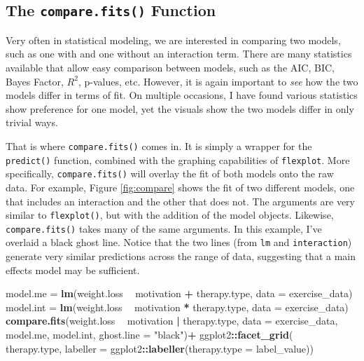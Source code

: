 \documentclass[
  doc]{apa6}
\newenvironment{Shaded}{\begin{snugshade}}{\end{snugshade}}
\newcommand{\DataTypeTok}[1]{\textcolor[rgb]{0.13,0.29,0.53}{#1}}
\newcommand{\KeywordTok}[1]{\textcolor[rgb]{0.13,0.29,0.53}{\textbf{#1}}}
\newcommand{\NormalTok}[1]{#1}
\newcommand{\OperatorTok}[1]{\textcolor[rgb]{0.81,0.36,0.00}{\textbf{#1}}}
\newcommand{\StringTok}[1]{\textcolor[rgb]{0.31,0.60,0.02}{#1}}
\begin{document}
\hypertarget{the-compare.fits-function}{%
\subsection{\texorpdfstring{The \texttt{compare.fits()} Function}{The compare.fits() Function}}\label{the-compare.fits-function}}

Very often in statistical modeling, we are interested in comparing two models, such as one with and one without an interaction term. There are many statistics available that allow easy comparison between models, such as the AIC, BIC, Bayes Factor, \(R^2\), p-values, etc. However, it is again important to \emph{see} how the two models differ in terms of fit. On multiple occasions, I have found various statistics show preference for one model, yet the visuals show the two models differ in only trivial ways.

That is where \texttt{compare.fits()} comes in. It is simply a wrapper for the \texttt{predict()} function, combined with the graphing capabilities of \texttt{flexplot}. More specifically, \texttt{compare.fits()} will overlay the fit of both models onto the raw data. For example, Figure \ref{fig:compare} shows the fit of two different models, one that includes an interaction and the other that does not. The arguments are very similar to \texttt{flexplot()}, but with the addition of the model objects. Likewise, \texttt{compare.fits()} takes many of the same arguments. In this example, I've overlaid a black ghost line. Notice that the two lines (from \texttt{lm} and \texttt{interaction}) generate very similar predictions across the range of data, suggesting that a main effects model may be sufficient.

\begin{Shaded}
\begin{Highlighting}[]
\NormalTok{model.me =}\StringTok{ }\KeywordTok{lm}\NormalTok{(weight.loss }\OperatorTok{~}\StringTok{ }\NormalTok{motivation }\OperatorTok{+}\StringTok{ }\NormalTok{therapy.type, }\DataTypeTok{data =}\NormalTok{ exercise_data)}
\NormalTok{model.int =}\StringTok{ }\KeywordTok{lm}\NormalTok{(weight.loss }\OperatorTok{~}\StringTok{ }\NormalTok{motivation }\OperatorTok{*}\StringTok{ }\NormalTok{therapy.type, }\DataTypeTok{data =}\NormalTok{ exercise_data)}
\KeywordTok{compare.fits}\NormalTok{(weight.loss }\OperatorTok{~}\StringTok{ }\NormalTok{motivation }\OperatorTok{|}\StringTok{ }\NormalTok{therapy.type, }
             \DataTypeTok{data =}\NormalTok{ exercise_data, model.me, model.int, }\DataTypeTok{ghost.line =} \StringTok{"black"}\NormalTok{)}\OperatorTok{+}
\StringTok{      }\NormalTok{ggplot2}\OperatorTok{::}\KeywordTok{facet_grid}\NormalTok{( }\OperatorTok{~}\StringTok{ }\NormalTok{therapy.type, }
          \DataTypeTok{labeller =}\NormalTok{ ggplot2}\OperatorTok{::}\KeywordTok{labeller}\NormalTok{(}\DataTypeTok{therapy.type =}\NormalTok{ label_value))}
\end{Highlighting}
\end{Shaded}
\end{document}
